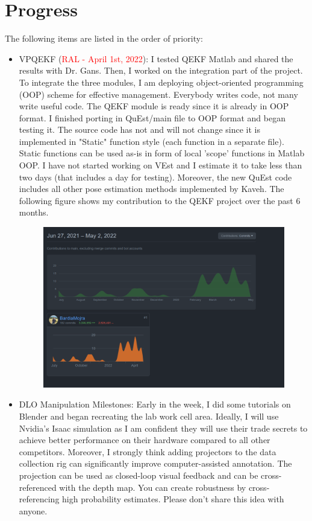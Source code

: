 \documentclass[11pt]{article}
\begin{document}
\section{Progress}
The following items are listed in the order of priority:
\begin{itemize}
    \item VPQEKF (\textcolor{red}{RAL - April 1st, 2022}): I tested QEKF Matlab
    and shared the results with Dr. Gans. Then, I worked on the
    integration part of the project. To integrate the three modules, I am
    deploying object-oriented programming (OOP) scheme for effective management.
    Everybody writes code, not many write useful code.
    The QEKF module is ready since it is already in OOP format. I finished
    porting in QuEst/main file to OOP format and began testing it. The source code
    has not and will not change since it is implemented in "Static"
    function style (each function in a separate file). Static functions can be
    used as-is in form of local 'scope' functions in Matlab OOP. I have not
    started working on VEst and I estimate it to take less than two days (that
    includes a day for testing). Moreover, the new QuEst code includes all other pose
    estimation methods implemented by Kaveh. The following figure shows my
    contribution to the QEKF project over the past 6 months.

    \begin{figure}
      \includegraphics[width=\linewidth]{qekf_contribs.png}
    \end{figure}

    \item DLO Manipulation Milestones: Early in the week, I did some tutorials
    on Blender and began recreating the lab work cell area. Ideally, I will use
    Nvidia's Isaac simulation as I am confident they will use their trade secrets
    to achieve better performance on their hardware compared to all other
    competitors. Moreover, I strongly think adding projectors to the data collection
    rig can significantly improve computer-assisted annotation. The projection
    can be used as closed-loop visual feedback and can be cross-referenced
    with the depth map. You can create robustness by cross-referencing high
    probability estimates. Please don't share this idea with anyone.


\end{itemize}
\end{document}
